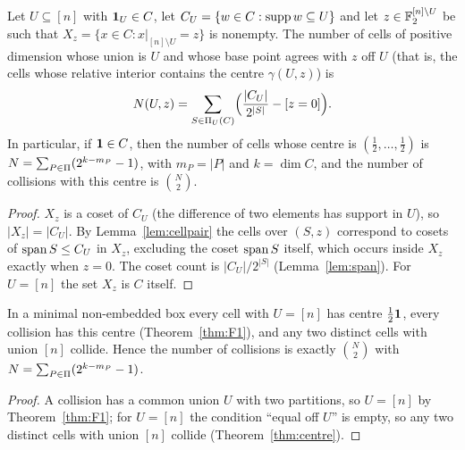 \begin{proposition}\label{prop:centre-count}
Let $U\subseteq[n]$ with $\mathbf 1_U\in C$, let $C_U=\{w\in C:\operatorname{supp} w\subseteq U\}$ and let $z\in\mathbb F_2^{[n]\setminus U}$ be such that $X_z=\{x\in C: x|_{[n]\setminus U}=z\}$ is nonempty. The number of cells of positive dimension whose union is $U$ and whose base point agrees with $z$ off $U$ (that is, the cells whose relative interior contains the centre $\gamma(U,z)$) is
\[
N(U,z)=\sum_{S\in\Pi_U(C)}\Bigl(\frac{|C_U|}{2^{|S|}}-[z=0]\Bigr).
\]
In particular, if $\mathbf 1\in C$, then the number of cells whose centre is $(\tfrac12,\dots,\tfrac12)$ is $N=\sum_{P\in\Pi}(2^{k-m_P}-1)$, with $m_P=|P|$ and $k=\dim C$, and the number of collisions with this centre is $\binom N2$.
\end{proposition}

\begin{proof}
$X_z$ is a coset of $C_U$ (the difference of two elements has support in $U$), so $|X_z|=|C_U|$. By Lemma~\ref{lem:cellpair} the cells over $(S,z)$ correspond to cosets of $\operatorname{span} S\le C_U$ in $X_z$, excluding the coset $\operatorname{span} S$ itself, which occurs inside $X_z$ exactly when $z=0$. The coset count is $|C_U|/2^{|S|}$ (Lemma~\ref{lem:span}). For $U=[n]$ the set $X_z$ is $C$ itself.
\end{proof}

\begin{corollary}\label{cor:collcount}
In a minimal non-embedded box every cell with $U=[n]$ has centre $\tfrac12\mathbf 1$, every collision has this centre (Theorem~\ref{thm:F1}), and any two distinct cells with union $[n]$ collide. Hence the number of collisions is exactly $\binom N2$ with $N=\sum_{P\in\Pi}(2^{k-m_P}-1)$.
\end{corollary}

\begin{proof}
A collision has a common union $U$ with two partitions, so $U=[n]$ by Theorem~\ref{thm:F1}; for $U=[n]$ the condition ``equal off $U$'' is empty, so any two distinct cells with union $[n]$ collide (Theorem~\ref{thm:centre}).
\end{proof}


